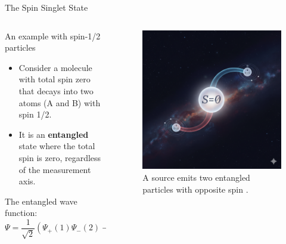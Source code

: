 \begin{frame}{The Spin Singlet State}
  \begin{columns}[T]
    \begin{column}{0.5\textwidth}
      \begin{block}{An example with spin-1/2 particles}
        \begin{itemize}[<+->]
          \item Consider a molecule with total spin zero that decays into two atoms (A and B) with spin 1/2.
          \item It is an \textbf{entangled} state where the total spin is zero, regardless of the measurement axis.
        \end{itemize}
      \end{block}
      \vspace{0.5em}
      The entangled wave function:
      $$ {\Psi} = \frac{1}{\sqrt{2}} \left( \Psi_{+}{(1)} \Psi_{-}{(2)} - \Psi_{-}{(1)} \Psi_{+}{(2)} \right) $$
    \end{column}

    \begin{column}{0.5\textwidth}
      \begin{figure}
        \centering
        \includegraphics[height=0.7\textheight, keepaspectratio]{images/spin.png}
        \caption{A source emits two entangled particles with opposite spin \cite{google_fuente_2025}.}
      \end{figure}
    \end{column}
  \end{columns}
\end{frame}

